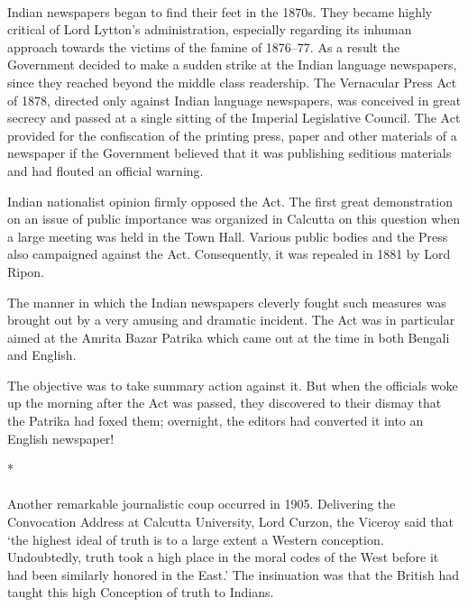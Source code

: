 \paragraph*{}

Indian newspapers began to find their feet in the 1870s. They became highly critical of Lord Lytton's administration, especially regarding its inhuman approach towards the victims of the famine of 1876--77. As a result the Government decided to make a sudden strike at the Indian language newspapers, since they reached beyond the middle class readership. The Vernacular Press Act of 1878, directed only against Indian language newspapers, was conceived in great secrecy and passed at a single sitting of the Imperial Legislative Council. The Act provided for the confiscation of the printing press, paper and other materials of a newspaper if the Government believed that it was publishing seditious materials and had flouted an official warning.

Indian nationalist opinion firmly opposed the Act. The first great demonstration on an issue of public importance was organized in Calcutta on this question when a large meeting was held in the Town Hall. Various public bodies and the Press also campaigned against the Act. Consequently, it was repealed in 1881 by Lord Ripon.

The manner in which the Indian newspapers cleverly fought such measures was brought out by a very amusing and dramatic incident. The Act was in particular aimed at the Amrita Bazar Patrika which came out at the time in both Bengali and English.

The objective was to take summary action against it. But when the officials woke up the morning after the Act was passed, they discovered to their dismay that the Patrika had foxed them; overnight, the editors had converted it into an English newspaper!

\begin{center}*\end{center}

\paragraph*{}

Another remarkable journalistic coup occurred in 1905. Delivering the Convocation Address at Calcutta University, Lord Curzon, the Viceroy said that `the highest ideal of truth is to a large extent a Western conception. Undoubtedly, truth took a high place in the moral codes of the West before it had been similarly honored in the East.' The insinuation was that the British had taught this high Conception of truth to Indians.


